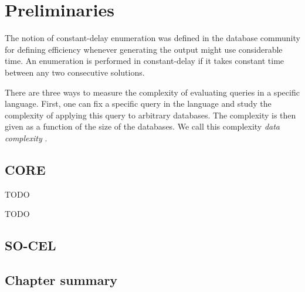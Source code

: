 \chapter{Preliminaries}\label{chapter:preliminaries}

The notion of constant-delay enumeration was defined in the database community \cite{Segoufin13enumeratingwith, 10.1007/978-3-540-74915-8_18} for defining efficiency whenever generating the output might use considerable time. An enumeration is performed in constant-delay if it takes constant time between any two consecutive solutions.

There are three ways to measure the complexity of evaluating queries in a specific language. First, one can fix a specific query in the language and study the complexity of applying this query to arbitrary databases. The complexity is then given as a function of the size of the databases. We call this complexity \textit{data complexity} \cite{DataComplexity}.

\section{CORE}

\begin{definition}[Match]
  \label{def:match}
  TODO
\end{definition}

\begin{definition}
  \label{def:maximalmatch}
  TODO
\end{definition}

\section{SO-CEL}

\section{Chapter summary}

